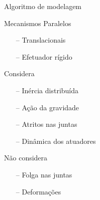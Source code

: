 \documentclass[25pt,landscape]{beamer}
\begin{document}
\begin{frame}{Algoritmo de modelagem}
    \pause
    \begin{block}{Mecanismos Paralelos}
        \begin{itemize}
            \item[--] Translacionais \\[4pt]
            \item[--] Efetuador r\'igido \\[4pt]
        \end{itemize}
    \end{block}
    \pause
    \begin{block}{Considera}
        \begin{itemize}
            \item[--] In\'ercia distribu\'ida \\[4pt]
            \item[--] A\c{c}\~ao da gravidade \\[4pt]
            \item[--] Atritos nas juntas \\[4pt]
            \item[--] Din\^amica dos atuadores \\[4pt]
        \end{itemize}
    \end{block}
    \pause
    \begin{block}{N\~ao considera}
        \begin{itemize}
            \item[--] Folga nas juntas \\[4pt]
            \item[--] Deforma\c{c}\~oes \\[4pt]
        \end{itemize}
    \end{block}
\end{frame}
\end{document}
